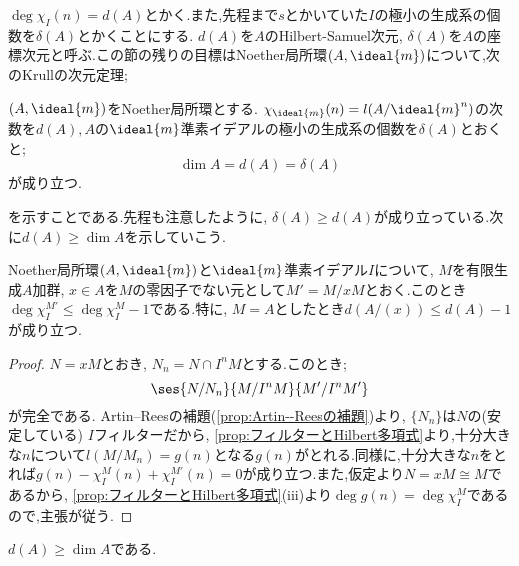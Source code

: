 $\deg\chi_I(n)=d(A)$とかく.また,先程まで$s$とかいていた$I$の極小の生成系の個数を$\delta(A)$とかくことにする. $d(A)$を$A$のHilbert-Samuel次元, $\delta(A)$を$A$の座標次元と呼ぶ.この節の残りの目標はNoether局所環$(A,\ideal{m})$について,次のKrullの次元定理;
\begin{thm}[Krullの次元定理]\label{thm:Krullの次元定理}
	$(A,\ideal{m})$をNoether局所環とする. $\chi_{\ideal{m}}(n)=l(A/\ideal{m}^n)$の次数を$d(A),A$の$\ideal{m}$準素イデアルの極小の生成系の個数を$\delta(A)$とおくと;
	\[\dim A=d(A)=\delta(A)\]
	が成り立つ.
\end{thm}

を示すことである.先程も注意したように, $\delta(A)\geq d(A)$が成り立っている.次に$d(A)\geq\dim A$を示していこう.

\begin{lem}\label{lem:商の特性多項式を上から抑える}
	Noether局所環$(A,\ideal{m})$と$\ideal{m}$準素イデアル$I$について, $M$を有限生成$A$加群, $x\in A$を$M$の零因子でない元として$M'=M/xM$とおく.このとき$\deg\chi_I^{M'}\leq\deg\chi_I^M-1$である.特に, $M=A$としたとき$d(A/(x))\leq d(A)-1$が成り立つ.
\end{lem}

\begin{proof}
	$N=xM$とおき, $N_n=N\cap I^nM$とする.このとき;
	\[\ses{N/N_n}{M/I^nM}{M'/I^nM'}\]
	が完全である. Artin--Reesの補題(\ref{prop:Artin--Reesの補題})より, $\{N_n\}$は$N$の(安定している) $I$フィルターだから, \ref{prop:フィルターとHilbert多項式}より,十分大きな$n$について$l(M/M_n)=g(n)$となる$g(n)$がとれる.同様に,十分大きな$n$をとれば$g(n)-\chi_I^M(n)+\chi_I^{M'}(n)=0$が成り立つ.また,仮定より$N=xM\cong M$であるから, \ref{prop:フィルターとHilbert多項式}(iii)より$\deg g(n)=\deg\chi_I^M$であるので,主張が従う.
\end{proof}

\begin{prop}\label{prop:d(A)geq dim A}
	$d(A)\geq\dim A$である.
\end{prop}

